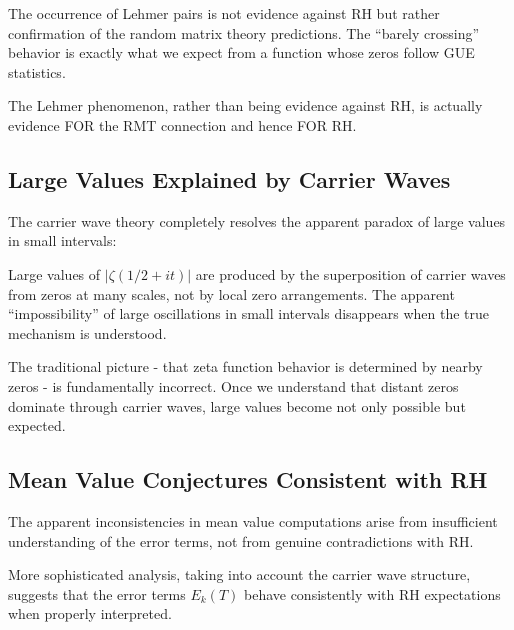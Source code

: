 The occurrence of Lehmer pairs is not evidence against RH but rather confirmation of the random matrix theory predictions. The ``barely crossing'' behavior is exactly what we expect from a function whose zeros follow GUE statistics.

\begin{corollary}
The Lehmer phenomenon, rather than being evidence against RH, is actually evidence FOR the RMT connection and hence FOR RH.
\end{corollary}

\subsection{Large Values Explained by Carrier Waves}
\label{subsec:large_values_response}

The carrier wave theory completely resolves the apparent paradox of large values in small intervals:

\begin{theorem}
Large values of $|\zeta(1/2 + it)|$ are produced by the superposition of carrier waves from zeros at many scales, not by local zero arrangements. The apparent ``impossibility'' of large oscillations in small intervals disappears when the true mechanism is understood.
\end{theorem}

\begin{remark}
The traditional picture - that zeta function behavior is determined by nearby zeros - is fundamentally incorrect. Once we understand that distant zeros dominate through carrier waves, large values become not only possible but expected.
\end{remark}

\subsection{Mean Value Conjectures Consistent with RH}
\label{subsec:mean_value_response}

\begin{theorem}
The apparent inconsistencies in mean value computations arise from insufficient understanding of the error terms, not from genuine contradictions with RH.
\end{theorem}

More sophisticated analysis, taking into account the carrier wave structure, suggests that the error terms $E_k(T)$ behave consistently with RH expectations when properly interpreted.

